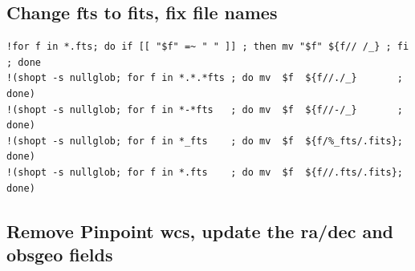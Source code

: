 \documentclass[letter,11pt,oneside]{article}
\begin{document}
\subsection{Change fts to fits, fix file names}

{\color{verbcolor}
\begin{verbatim}
!for f in *.fts; do if [[ "$f" =~ " " ]] ; then mv "$f" ${f// /_} ; fi ; done
!(shopt -s nullglob; for f in *.*.*fts ; do mv  $f  ${f//./_}       ; done)
!(shopt -s nullglob; for f in *-*fts   ; do mv  $f  ${f//-/_}       ; done)
!(shopt -s nullglob; for f in *_fts    ; do mv  $f  ${f/%_fts/.fits}; done)
!(shopt -s nullglob; for f in *.fts    ; do mv  $f  ${f//.fts/.fits}; done)
\end{verbatim}
}
\clearpage
\subsection{Remove Pinpoint wcs, update the ra/dec and obsgeo fields}
\end{document}
